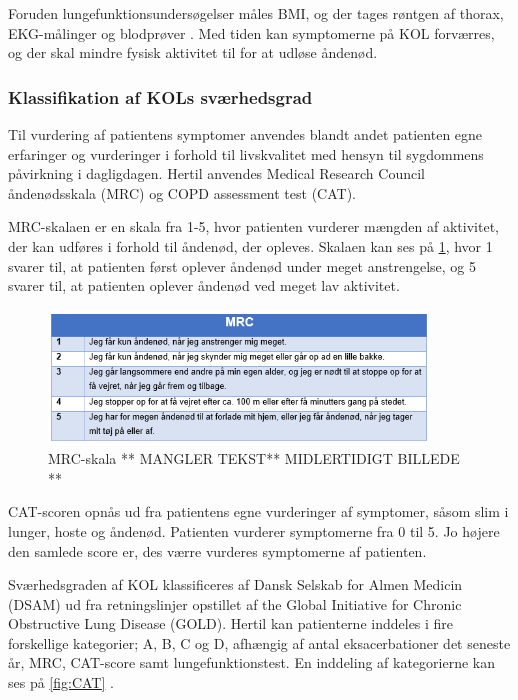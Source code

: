 \noindent
Foruden lungefunktionsundersøgelser måles BMI, og der tages røntgen af thorax, EKG-målinger og blodprøver \cite{Sundhed2013}.
Med tiden kan symptomerne på KOL forværres, og der skal mindre fysisk aktivitet til for at udløse åndenød. \cite{Basisbogen2016}

\subsubsection{Klassifikation af KOLs sværhedsgrad}
Til vurdering af patientens symptomer anvendes blandt andet patienten egne erfaringer og vurderinger i forhold til livskvalitet med hensyn til sygdommens påvirkning i dagligdagen. Hertil anvendes Medical Research Council åndenødsskala (MRC) og COPD assessment test (CAT).
 
MRC-skalaen er en skala fra 1-5, hvor patienten vurderer mængden af aktivitet, der kan udføres i forhold til åndenød, der opleves. Skalaen kan ses på \ref{fig:MRC}, hvor 1 svarer til, at patienten først oplever åndenød under meget anstrengelse, og 5 svarer til, at patienten oplever åndenød ved meget lav aktivitet.

\begin{figure} [H]
\centering
\includegraphics[width=0.9\textwidth]{figures/MRC}
\caption{MRC-skala ** MANGLER TEKST** MIDLERTIDIGT BILLEDE ** \cite{Basisbogen2016}}
\label{fig:MRC}
\end{figure} 

\noindent
CAT-scoren opnås ud fra patientens egne vurderinger af symptomer, såsom slim i lunger, hoste og åndenød. Patienten vurderer symptomerne fra 0 til 5. Jo højere den samlede score er, des værre vurderes symptomerne af patienten. \cite{Basisbogen2016}
 
Sværhedsgraden af KOL klassificeres af Dansk Selskab for Almen Medicin (DSAM) ud fra retningslinjer opstillet af the Global Initiative for Chronic Obstructive Lung Disease (GOLD). Hertil kan patienterne inddeles i fire forskellige kategorier; A, B, C og D, afhængig af antal eksacerbationer det seneste år, MRC, CAT-score samt lungefunktionstest.\cite{dsam2016} En inddeling af kategorierne kan ses på \ref{fig:CAT} .

